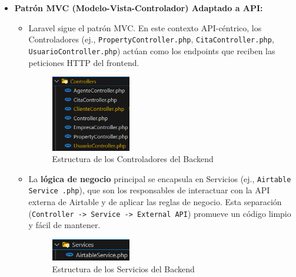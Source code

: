 \begin{itemize}
    \item \textbf{Patrón MVC (Modelo-Vista-Controlador) Adaptado a API:} 

    \begin{itemize}
        \item Laravel sigue el patrón MVC. En este contexto API-céntrico, los Controladores (ej., \texttt{PropertyController.php}, \texttt{CitaController.php}, \texttt{UsuarioController.php}) actúan como los endpoints que reciben las peticiones HTTP del frontend.

        \begin{figure}[H]
            \begin{center}
                \includegraphics[width = 0.35\textwidth]{Figuras/directoriosbackendcontrollers.png}
            \end{center}
            \caption{\label{fig:directoriosbackendcontrollers} Estructura de los Controladores del Backend}
        \end{figure}

        \item La \textbf{lógica de negocio} principal se encapsula en Servicios (ej., \texttt{Airtable Service .php}), que son los responsables de interactuar con la API externa de Airtable y de aplicar las reglas de negocio. Esta separación (\texttt{Controller -> Service -> External API}) promueve un código limpio y fácil de mantener.

        \begin{figure}[H]
            \begin{center}
                \includegraphics[width = 0.35\textwidth]{Figuras/directoriosbackendservices.png}
            \end{center}
            \caption{\label{fig:directoriosbackendservices} Estructura de los Servicios del Backend}
        \end{figure}
    \end{itemize}


\end{itemize}
